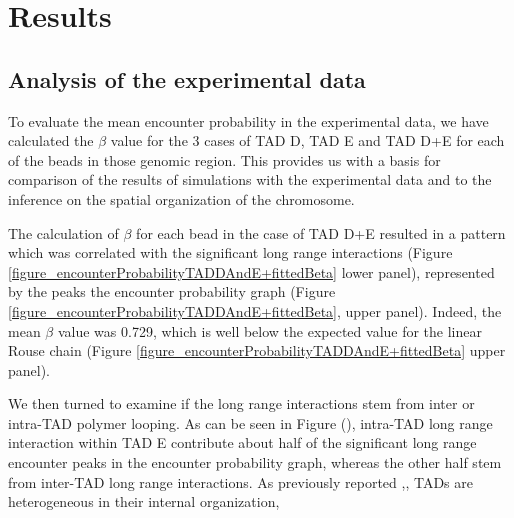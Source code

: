 \documentclass[12pt]{paper}
\begin{document}






\section{Results}\label{section_results}
\subsection{Analysis of the experimental data}\label{subsection_analysisOfTheExperimentalData}

To evaluate the mean encounter probability in the experimental data, we have calculated the $\beta$ value for the 3 cases of TAD D, TAD E and TAD D+E for each of the beads in those genomic region. This provides us with a basis for comparison of the results of simulations with the experimental data and to the inference on the spatial organization of the chromosome. 

The calculation of $\beta$ for each bead in the case of TAD D+E resulted in a pattern which was correlated with the significant long range interactions (Figure \ref{figure_encounterProbabilityTADDAndE+fittedBeta} lower panel), represented by the peaks the encounter probability graph (Figure \ref{figure_encounterProbabilityTADDAndE+fittedBeta}, upper panel). Indeed, the mean $\beta$ value was 0.729, which is well below the expected value for the linear Rouse chain (Figure \ref{figure_encounterProbabilityTADDAndE+fittedBeta} upper panel). 

We then turned to examine if the long range interactions stem from inter or intra-TAD polymer looping. As can be seen in Figure (), intra-TAD long range interaction within TAD E contribute about half of the significant long range encounter peaks in the encounter probability graph, whereas the other half stem from inter-TAD long range interactions. As previously reported \cite{Nora2012},\cite{dekker2013exploring}, TADs are heterogeneous in their internal organization, 
\end{document}
